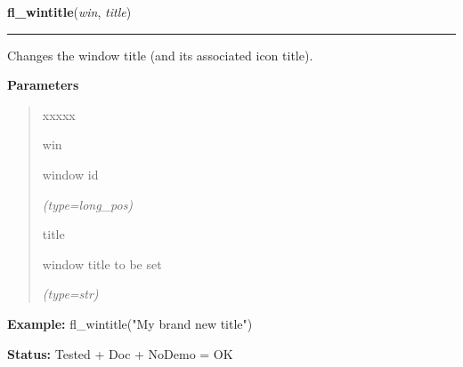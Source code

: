 \hspace{.8\funcindent}\begin{boxedminipage}{\funcwidth}

    \raggedright \textbf{fl\_wintitle}(\textit{win}, \textit{title})

    \vspace{-1.5ex}

    \rule{\textwidth}{0.5\fboxrule}
\setlength{\parskip}{2ex}
    Changes the window title (and its associated icon title).

\setlength{\parskip}{1ex}
      \textbf{Parameters}
      \vspace{-1ex}

      \begin{quote}
        \begin{Ventry}{xxxxx}

          \item[win]

          window id

            {\it (type=long\_pos)}

          \item[title]

          window title to be set

            {\it (type=str)}

        \end{Ventry}

      \end{quote}

\textbf{Example:} fl\_wintitle("My brand new title")



\textbf{Status:} Tested + Doc + NoDemo = OK



    \end{boxedminipage}

    \label{xformslib:flxbasic:fl_winicontitle}

    \vspace{0.5ex}

